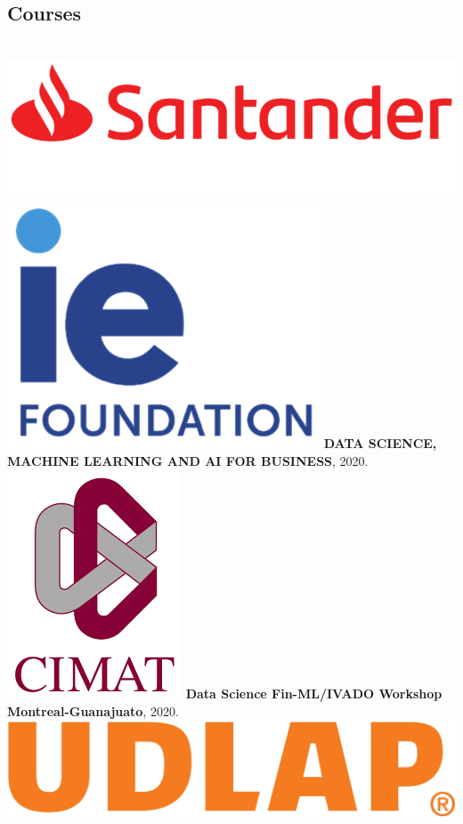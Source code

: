 \documentclass[]{friggeri-cv}
\begin{document}
\begin{aside}
	\section{Courses}
	~
	\includegraphics[scale=0.08]{img/santander.png}\includegraphics[scale=0.08]{img/ie.png}
	\textbf{DATA SCIENCE, MACHINE LEARNING AND AI FOR BUSINESS}, 2020.
	\includegraphics[scale=0.15]{img/cimat.png}
	\textbf{Data Science Fin-ML/IVADO Workshop Montreal-Guanajuato}, 2020.
	\includegraphics[scale=0.025]{img/UDLAP.jpg}

\end{aside}
\end{document}
